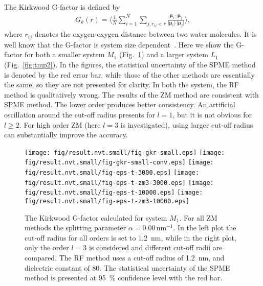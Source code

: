 \documentclass[aip,jcp,a4paper,reprint,unsortedaddress,onecolumn,fleqn]{revtex4-1}
\newcommand{\systemmb}{M_1}
\newcommand{\systemlb}{L_1}
\begin{document}
The Kirkwood G-factor is defined by~\cite{vanderSpoel2006origin}
\begin{align}
  G_k(r) =
  \Big\langle
  \frac 1N
  \sum_{i=1}^N \sum_{j, r_{ij} < r}
  \frac {\boldsymbol\mu_i \cdot \boldsymbol\mu_j}{\vert \boldsymbol\mu_i\vert \cdot \vert\boldsymbol\mu_j\vert}
  \Big\rangle,
\end{align}
where $r_{ij}$ denotes the oxygen-oxygen distance between two water
molecules.  It is well know that the G-factor is system size
dependent~\cite{vanderSpoel2006origin}. Here we show the G-factor for
both a smaller system $\systemmb$ (Fig.~\ref{fig:tmp1}) and a larger system $\systemlb$
(Fig.~\ref{fig:tmp2}).  In the figures, the statistical uncertainty of
the SPME method is denoted by the red error bar, while those of the
other methods are essentially the same, so they are not presented for
clarity.  In both the system, the RF method is qualitatively
wrong. The results of the ZM method are consistent with SPME
method. The lower order produces better consistency.  An artificial
oscillation around the cut-off radius presents for $l=1$, but it is
not obvious for $l\geq 2$.  For high order ZM (here $l=3$ is investigated),
using larger cut-off radius can substantially improve the accuracy.

\begin{figure}
  \centering
  \texttt{[image: fig/result.nvt.small/fig-gkr-small.eps]}
  \texttt{[image: fig/result.nvt.small/fig-gkr-small-conv.eps]}
  \texttt{[image: fig/result.nvt.small/fig-eps-t-3000.eps]}
  \texttt{[image: fig/result.nvt.small/fig-eps-t-zm3-3000.eps]}
  \texttt{[image: fig/result.nvt.small/fig-eps-t-10000.eps]}
  \texttt{[image: fig/result.nvt.small/fig-eps-t-zm3-10000.eps]}
  \caption{The Kirkwood G-factor calculated for system $\systemmb$.
    For all ZM methods the splitting parameter $\alpha = 0.00\,\textrm{nm}^{-1}$.
    In the left plot the cut-off radius for all orders is set to $1.2$~nm, while
    in the right plot, only the order $l=3$ is considered and different cut-off radii are compared.
    The RF method uses a cut-off radius of 1.2~nm, and dielectric constant of 80.
    The statistical uncertainty of the SPME method is presented at 95~\% confidence level with the red bar.
  }
  \label{fig:tmp1}
\end{figure}
\end{document}
